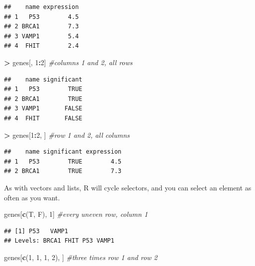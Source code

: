 \documentclass[]{book}
\newenvironment{Shaded}{\begin{snugshade}}{\end{snugshade}}
\newcommand{\CommentTok}[1]{\textcolor[rgb]{0.56,0.35,0.01}{\textit{#1}}}
\newcommand{\DecValTok}[1]{\textcolor[rgb]{0.00,0.00,0.81}{#1}}
\newcommand{\KeywordTok}[1]{\textcolor[rgb]{0.13,0.29,0.53}{\textbf{#1}}}
\newcommand{\NormalTok}[1]{#1}
\newcommand{\OperatorTok}[1]{\textcolor[rgb]{0.81,0.36,0.00}{\textbf{#1}}}
\newcommand{\StringTok}[1]{\textcolor[rgb]{0.31,0.60,0.02}{#1}}
\begin{document}
\begin{verbatim}
##    name expression
## 1   P53        4.5
## 2 BRCA1        7.3
## 3 VAMP1        5.4
## 4  FHIT        2.4
\end{verbatim}

\begin{Shaded}
\begin{Highlighting}[]
\OperatorTok{>}\StringTok{ }\NormalTok{genes[, }\DecValTok{1}\OperatorTok{:}\DecValTok{2}\NormalTok{]      }\CommentTok{#columns 1 and 2, all rows}
\end{Highlighting}
\end{Shaded}

\begin{verbatim}
##    name significant
## 1   P53        TRUE
## 2 BRCA1        TRUE
## 3 VAMP1       FALSE
## 4  FHIT       FALSE
\end{verbatim}

\begin{Shaded}
\begin{Highlighting}[]
\OperatorTok{>}\StringTok{ }\NormalTok{genes[}\DecValTok{1}\OperatorTok{:}\DecValTok{2}\NormalTok{, ]      }\CommentTok{#row 1 and 2, all columns}
\end{Highlighting}
\end{Shaded}

\begin{verbatim}
##    name significant expression
## 1   P53        TRUE        4.5
## 2 BRCA1        TRUE        7.3
\end{verbatim}

As with vectors and lists, R will cycle selectors, and you can select an element as often as you want.

\begin{Shaded}
\begin{Highlighting}[]
\NormalTok{genes[}\KeywordTok{c}\NormalTok{(T, F), }\DecValTok{1}\NormalTok{]   }\CommentTok{#every uneven row, column 1}
\end{Highlighting}
\end{Shaded}

\begin{verbatim}
## [1] P53   VAMP1
## Levels: BRCA1 FHIT P53 VAMP1
\end{verbatim}

\begin{Shaded}
\begin{Highlighting}[]
\NormalTok{genes[}\KeywordTok{c}\NormalTok{(}\DecValTok{1}\NormalTok{, }\DecValTok{1}\NormalTok{, }\DecValTok{1}\NormalTok{, }\DecValTok{2}\NormalTok{), ]  }\CommentTok{#three times row 1 and row 2}
\end{Highlighting}
\end{Shaded}
\end{document}
